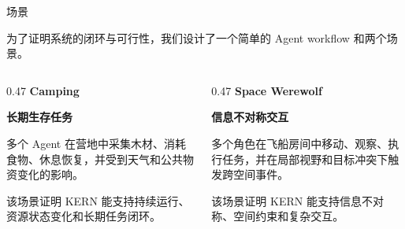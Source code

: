 ﻿\documentclass[aspectratio=169,11pt]{beamer}
\newcommand{\bigclaim}[1]{{\color{Ink}\fontsize{22}{27}\selectfont\bfseries #1}}
\begin{document}
\begin{frame}{场景}
    \begin{minipage}{0.92\linewidth}
      \small
      为了证明系统的闭环与可行性，我们设计了一个简单的 Agent workflow 和两个场景。
    \end{minipage}

    \vspace{0.48cm}
    \begin{columns}[T,totalwidth=\linewidth]
    \begin{column}{0.47\linewidth}
      \bigclaim{Camping}
      \vspace{0.34cm}

      {\color{Moss}\large\bfseries 长期生存任务}\par
      \vspace{0.24cm}
      \small
      多个 Agent 在营地中采集木材、消耗食物、休息恢复，并受到天气和公共物资变化的影响。

      \vspace{0.3cm}
      该场景证明 KERN 能支持持续运行、资源状态变化和长期任务闭环。
    \end{column}
    \begin{column}{0.47\linewidth}
      \bigclaim{Space Werewolf}
      \vspace{0.34cm}

      {\color{Moss}\large\bfseries 信息不对称交互}\par
      \vspace{0.24cm}
      \small
      多个角色在飞船房间中移动、观察、执行任务，并在局部视野和目标冲突下触发跨空间事件。

      \vspace{0.3cm}
      该场景证明 KERN 能支持信息不对称、空间约束和复杂交互。
    \end{column}
  \end{columns}
\end{frame}
\end{document}
